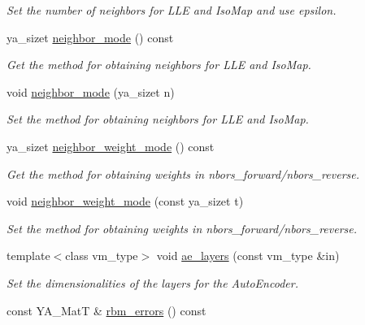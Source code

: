 \begin{CompactItemize}
\begin{CompactList}\small\item\em Set the number of neighbors for LLE and Iso\-Map and use epsilon. \item\end{CompactList}\item 
ya\_\-sizet \hyperlink{class_y_a_dim_reduce_a25}{neighbor\_\-mode} () const 
\begin{CompactList}\small\item\em Get the method for obtaining neighbors for LLE and Iso\-Map. \item\end{CompactList}\item 
void \hyperlink{class_y_a_dim_reduce_a26}{neighbor\_\-mode} (ya\_\-sizet n)
\begin{CompactList}\small\item\em Set the method for obtaining neighbors for LLE and Iso\-Map. \item\end{CompactList}\item 
ya\_\-sizet \hyperlink{class_y_a_dim_reduce_a27}{neighbor\_\-weight\_\-mode} () const 
\begin{CompactList}\small\item\em Get the method for obtaining weights in nbors\_\-forward/nbors\_\-reverse. \item\end{CompactList}\item 
void \hyperlink{class_y_a_dim_reduce_a28}{neighbor\_\-weight\_\-mode} (const ya\_\-sizet t)
\begin{CompactList}\small\item\em Set the method for obtaining weights in nbors\_\-forward/nbors\_\-reverse. \item\end{CompactList}\item 
\hypertarget{class_y_a_dim_reduce_a29}{
template$<$class vm\_\-type$>$ void \hyperlink{class_y_a_dim_reduce_a29}{ae\_\-layers} (const vm\_\-type \&in)}
\label{class_y_a_dim_reduce_a29}

\begin{CompactList}\small\item\em Set the dimensionalities of the layers for the Auto\-Encoder. \item\end{CompactList}\item 
\hypertarget{class_y_a_dim_reduce_a30}{
const YA\_\-Mat\-T \& \hyperlink{class_y_a_dim_reduce_a30}{rbm\_\-errors} () const }
\label{class_y_a_dim_reduce_a30}


\end{CompactItemize}
